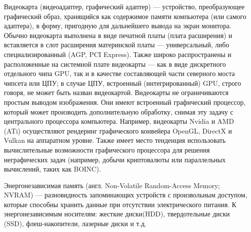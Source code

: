 Видеокарта (видеоадаптер, графический адаптер) --- устройство, преобразующее графический образ, хранящийся как содержимое памяти компьютера (или самого адаптера), в форму, пригодную для дальнейшего вывода на экран монитора. Обычно видеокарта выполнена в виде печатной платы (плата расширения) и вставляется в слот расширения материнской платы --- универсальный, либо специализированный (AGP, PCI Express).
Также широко распространены и расположенные на системной плате видеокарты --- как в виде дискретного отдельного чипа GPU, так и в качестве составляющей части северного моста чипсета или ЦПУ; в случае ЦПУ, встроенный (интегрированный) GPU, строго говоря, не может быть назван видеокартой.
Видеокарты не ограничиваются простым выводом изображения. Они имеют встроенный графический процессор, который может производить дополнительную обработку, снимая эту задачу с центрального процессора компьютера. Например, видеокарты Nvidia и AMD (ATi) осуществляют рендеринг графического конвейера OpenGL, DirectX и Vulkan на аппаратном уровне.
Также имеет место тенденция использовать вычислительные возможности графического процессора для решения неграфических задач (например, добычи криптовалюты или параллельных вычислений, таких как BOINC).

Энергонезависимая память (англ. Non-Volatile Random-Access Memory; NVRAM) --- разновидность запоминающих устройств с произвольным доступом, которые способны хранить данные при отсутствии электрического питания.
К энергонезависимым носителям: жесткие диски(HDD), твердотельные диски (SSD), флеш-накопители, лазерные диски и т.д.

